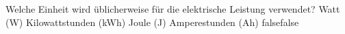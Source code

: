     {Welche Einheit wird üblicherweise für die elektrische Leistung verwendet?}
    {Watt (W)}
    {Kilowattstunden (kWh)}
    {Joule (J)}
    {Amperestunden (Ah)}
    {false}{false}